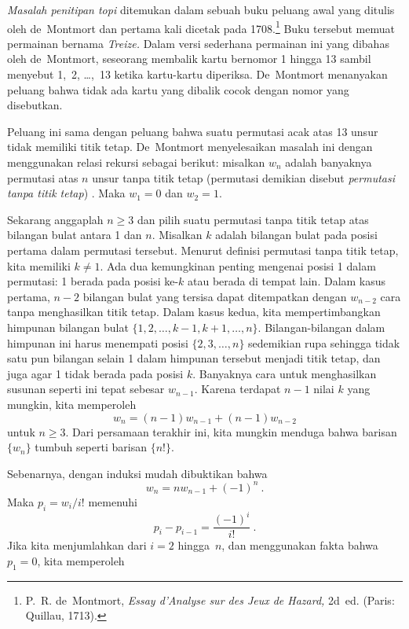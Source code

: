 {\em Masalah penitipan topi} ditemukan dalam sebuah buku
peluang awal yang ditulis oleh de~Montmort dan pertama kali
dicetak pada 1708.\footnote{P.~R. de~Montmort, {\em
Essay d'Analyse sur des Jeux de Hazard,} 2d~ed. (Paris: Quillau, 1713).}  Buku tersebut
memuat permainan bernama {\em Treize.}  Dalam versi sederhana permainan ini yang
dibahas oleh de~Montmort, seseorang membalik kartu bernomor 1 hingga 13 sambil menyebut
1,~2, \dots,~13 ketika kartu-kartu diperiksa.  De~Montmort menanyakan peluang bahwa
tidak ada kartu yang dibalik cocok dengan nomor yang disebutkan.
\par
Peluang ini sama dengan peluang bahwa suatu permutasi acak atas 13 unsur tidak memiliki
titik tetap.  De~Montmort menyelesaikan masalah ini dengan menggunakan relasi rekursi
sebagai berikut: misalkan $w_n$ adalah banyaknya permutasi atas $n$ unsur tanpa titik
tetap (permutasi demikian disebut {\em permutasi tanpa titik tetap})
.  Maka $w_1 = 0$ dan
$w_2 = 1$.
\par Sekarang anggaplah $n \ge 3$ dan pilih suatu permutasi tanpa titik tetap atas
bilangan bulat antara 1 dan $n$.  Misalkan $k$ adalah bilangan bulat pada posisi pertama
dalam permutasi tersebut.  Menurut definisi permutasi tanpa titik tetap, kita memiliki
$k \ne 1$.  Ada dua kemungkinan penting mengenai posisi 1 dalam permutasi: 1 berada
pada posisi ke-$k$ atau berada di tempat lain.  Dalam kasus pertama, $n-2$ bilangan bulat
yang tersisa dapat ditempatkan dengan $w_{n-2}$ cara tanpa menghasilkan titik tetap.
Dalam kasus kedua, kita mempertimbangkan himpunan bilangan bulat
$\{1, 2, \ldots, k-1, k+1, \ldots, n\}$.  Bilangan-bilangan dalam himpunan ini harus
menempati posisi $\{2, 3, \ldots, n\}$ sedemikian rupa sehingga tidak satu pun bilangan
selain 1 dalam himpunan tersebut menjadi titik tetap, dan juga agar 1 tidak berada pada
posisi $k$.  Banyaknya cara untuk menghasilkan susunan seperti ini tepat sebesar
$w_{n-1}$.  Karena terdapat $n-1$ nilai $k$ yang mungkin, kita memperoleh
$$ w_n = (n - 1)w_{n - 1} + (n - 1)w_{n -2}
$$ untuk $n \ge 3$.  Dari persamaan terakhir ini, kita mungkin menduga bahwa barisan
$\{w_n\}$ tumbuh seperti barisan $\{n!\}$.  
\par Sebenarnya, dengan induksi mudah dibuktikan bahwa
$$ w_n = nw_{n - 1} + (-1)^n\ .
$$ Maka $p_i = w_i/i!$ memenuhi
$$ p_i - p_{i - 1} = \frac{(-1)^i}{i!}\ .
$$ Jika kita menjumlahkan dari $i = 2$ hingga~$n$, dan menggunakan fakta bahwa
$p_1 = 0$, kita memperoleh
